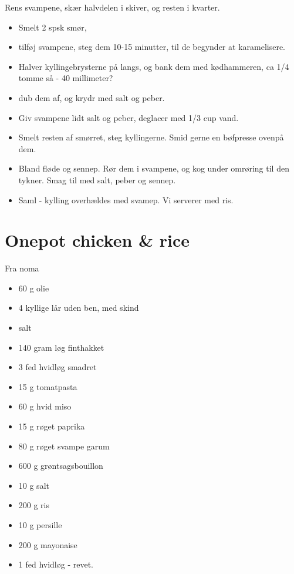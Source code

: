 \documentclass[
]{book}
\providecommand{\tightlist}{%
  \setlength{\itemsep}{0pt}\setlength{\parskip}{0pt}}
\begin{document}
Rens svampene, skær halvdelen i skiver, og resten i kvarter.

\begin{itemize}
\tightlist
\item
  Smelt 2 spsk smør,
\item
  tilføj svampene, steg dem 10-15 minutter, til
  de begynder at karamelisere.
\item
  Halver kyllingebrysterne på langs,
  og bank dem med kødhammeren, ca 1/4 tomme så - 40 millimeter?
\item
  dub dem af, og krydr med salt og peber.
\item
  Giv svampene lidt salt og peber, deglacer med 1/3 cup vand.
\item
  Smelt resten af smørret, steg kyllingerne. Smid gerne en
  bøfpresse ovenpå dem.
\item
  Bland fløde og sennep. Rør dem i svampene, og kog under omrøring
  til den tykner. Smag til med salt, peber og sennep.
\item
  Saml - kylling overhældes med svamep. Vi serverer med ris.
\end{itemize}

\hypertarget{onepot-chicken-rice}{%
\section{Onepot chicken \& rice}\label{onepot-chicken-rice}}

Fra noma

\begin{itemize}
\item
  60 g olie
\item
  4 kyllige lår uden ben, med skind
\item
  salt
\item
  140 gram løg finthakket
\item
  3 fed hvidløg smadret
\item
  15 g tomatpasta
\item
  60 g hvid miso
\item
  15 g røget paprika
\item
  80 g røget svampe garum
\item
  600 g grøntsagsbouillon
\item
  10 g salt
\item
  200 g ris
\item
  10 g persille
\item
  200 g mayonaise
\item
  1 fed hvidløg - revet.
\end{itemize}
\end{document}
